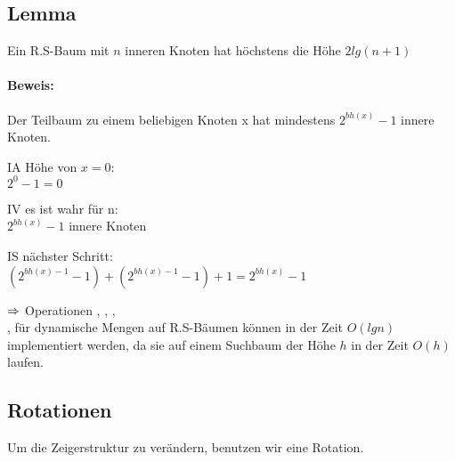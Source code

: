 \documentclass[a4paper]{scrartcl}
\begin{document}
\subsection*{Lemma}

Ein R.S-Baum mit $n$ inneren Knoten hat höchstens die Höhe $2lg(n+1)$

\paragraph{Beweis:}

Der Teilbaum zu einem beliebigen Knoten x hat mindestens $2^{bh(x)}-1$ innere Knoten.
\begin{description}
\item{IA} Höhe von $x=0$: \\
$2^0-1=0$
\item{IV} es ist wahr für n: \\
$2^{bh(x)}-1$ innere Knoten
\item{IS} nächster Schritt: \\
$(2^{bh(x)-1}-1)+(2^{bh(x)-1}-1)+1=2^{bh(x)}-1$
\end{description}

$\Rightarrow$ Operationen , , , \\
,  für dynamische Mengen auf R.S-Bäumen können in der Zeit $O(lgn)$ implementiert werden, 
da sie auf einem Suchbaum der Höhe $h$ in der Zeit $O(h)$ laufen.

\subsection{Rotationen}

Um die Zeigerstruktur zu verändern, benutzen wir eine Rotation.


\end{document}
